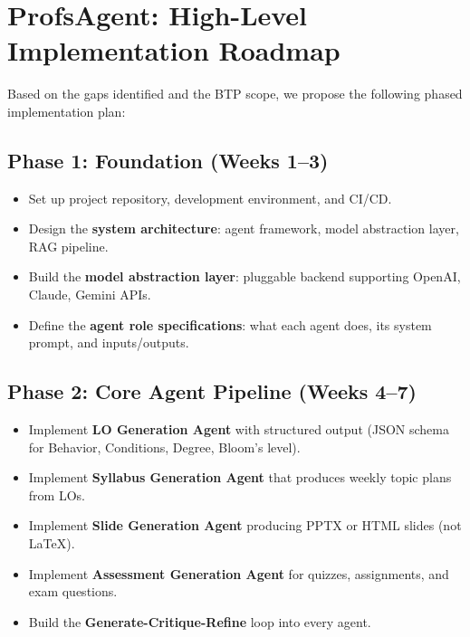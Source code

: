 \documentclass[11pt,a4paper]{article}
\begin{document}
\section{ProfsAgent: High-Level Implementation Roadmap}

Based on the gaps identified and the BTP scope, we propose the following phased implementation plan:

\subsection{Phase 1: Foundation (Weeks 1--3)}
\begin{itemize}[nosep]
    \item Set up project repository, development environment, and CI/CD.
    \item Design the \textbf{system architecture}: agent framework, model abstraction layer, RAG pipeline.
    \item Build the \textbf{model abstraction layer}: pluggable backend supporting OpenAI, Claude, Gemini APIs.
    \item Define the \textbf{agent role specifications}: what each agent does, its system prompt, and inputs/outputs.
\end{itemize}

\subsection{Phase 2: Core Agent Pipeline (Weeks 4--7)}
\begin{itemize}[nosep]
    \item Implement \textbf{LO Generation Agent} with structured output (JSON schema for Behavior, Conditions, Degree, Bloom's level).
    \item Implement \textbf{Syllabus Generation Agent} that produces weekly topic plans from LOs.
    \item Implement \textbf{Slide Generation Agent} producing PPTX or HTML slides (not LaTeX).
    \item Implement \textbf{Assessment Generation Agent} for quizzes, assignments, and exam questions.
    \item Build the \textbf{Generate-Critique-Refine} loop into every agent.
\end{itemize}
\end{document}
